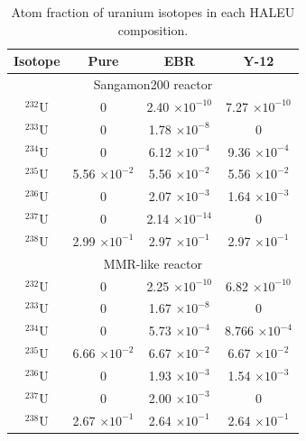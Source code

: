 \begin{table}[h]
    \centering 
    \caption{Atom fraction of uranium isotopes in each \gls*{HALEU}
    composition. }
    \label{tab:u_comps}
    \begin{tabular}{c c c c}
            \hline
            Isotope & Pure & \gls*{EBR} & Y-12 \\
            \hline
            \multicolumn{4}{c}{Sangamon200 reactor} \\
            $^{232}$U & 0 & 2.40 $\times 10^{-10}$ & 7.27 $\times 10^{-10}$ \\
            $^{233}$U & 0 & 1.78 $\times 10^{-8}$ & 0 \\
            $^{234}$U & 0 & 6.12 $\times 10^{-4}$ & 9.36 $\times 10^{-4}$\\
            $^{235}$U & 5.56 $\times 10^{-2}$ & 5.56 $\times 10^{-2}$ & 5.56 $\times 10^{-2}$\\
            $^{236}$U & 0 & 2.07 $\times 10^{-3}$ & 1.64 $\times 10^{-3}$ \\
            $^{237}$U & 0 & 2.14 $\times 10^{-14}$ & 0 \\
            $^{238}$U & 2.99 $\times 10^{-1}$ & 2.97 $\times 10^{-1}$ & 2.97 $\times 10^{-1}$ \\
            \hline 
            \multicolumn{4}{c}{MMR-like reactor} \\
            $^{232}$U & 0 & 2.25 $\times 10^{-10}$ & 6.82 $\times 10^{-10}$ \\
            $^{233}$U & 0 & 1.67 $\times 10^{-8}$ & 0 \\
            $^{234}$U & 0 & 5.73 $\times 10^{-4}$ & 8.766 $\times 10^{-4}$ \\
            $^{235}$U & 6.66 $\times 10^{-2}$ & 6.67 $\times 10^{-2}$ & 6.67 $\times 10^{-2}$ \\
            $^{236}$U & 0 & 1.93 $\times 10^{-3}$ & 1.54 $\times 10^{-3}$ \\
            $^{237}$U & 0 & 2.00 $\times 10^{-3}$ & 0 \\
            $^{238}$U & 2.67 $\times 10^{-1}$ & 2.64 $\times 10^{-1}$ & 2.64 $\times 10^{-1}$ \\
            \hline
    \end{tabular}
\end{table}
